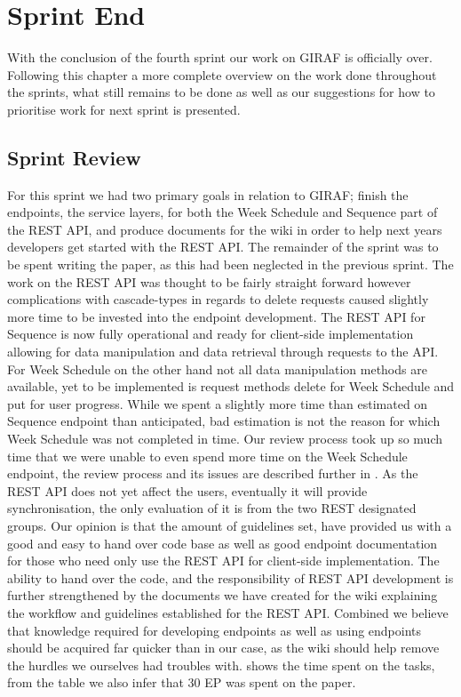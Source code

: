 \chapter{Sprint End}
With the conclusion of the fourth sprint our work on GIRAF is officially over.
Following this chapter a more complete overview on the work done throughout the sprints, what still remains to be done as well as our suggestions for how to prioritise work for next sprint is presented.

\section{Sprint Review}
For this sprint we had two primary goals in relation to GIRAF; finish the endpoints, the service layers, for both the Week Schedule and Sequence part of the REST API, and produce documents for the wiki in order to help next years developers get started with the REST API.
The remainder of the sprint was to be spent writing the paper, as this had been neglected in the previous sprint.
The work on the REST API was thought to be fairly straight forward however complications with cascade-types in regards to delete requests caused slightly more time to be invested into the endpoint development.
The REST API for Sequence is now fully operational and ready for client-side implementation allowing for data manipulation and data retrieval through requests to the API.
For Week Schedule on the other hand not all data manipulation methods are available, yet to be implemented is request methods delete for Week Schedule and put for user progress.
While we spent a slightly more time than estimated on Sequence endpoint than anticipated, bad estimation is not the reason for which Week Schedule was not completed in time.
Our review process took up so much time that we were unable to even spend more time on the Week Schedule endpoint, the review process and its issues are described further in .
As the REST API does not yet affect the users, eventually it will provide synchronisation, the only evaluation of it is from the two REST designated groups.
Our opinion is that the amount of guidelines set, have provided us with a good and easy to hand over code base as well as good endpoint documentation for those who need only use the REST API for client-side implementation.
The ability to hand over the code, and the responsibility of REST API development is further strengthened by the documents we have created for the wiki explaining the workflow and guidelines established for the REST API.
Combined we believe that knowledge required for developing endpoints as well as using endpoints should be acquired far quicker than in our case, as the wiki should help remove the hurdles we ourselves had troubles with.
 shows the time spent on the tasks, from the table we also infer that 30 EP was spent on the paper.

